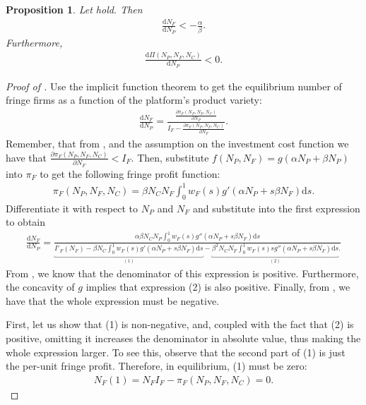 \documentclass[a4paper]{article}
\newtheorem{proposition}{Proposition}
\newcommand{\dd}{\mathrm{d}}
\newcommand{\ds}{\mathrm{d}s}
\begin{document}
\begin{proposition}
    \label{prop:aggregate_size_additive}
    Let  hold.
    Then
    \begin{align*}
        \frac{\dd N_F}{\dd N_P} < -\frac{\alpha}{\beta}.
    \end{align*}
    Furthermore,
    \begin{align*}
        \frac{\dd \Pi(N_P, N_F, N_C)}{\dd N_P} < 0.
    \end{align*}
\end{proposition}
\begin{proof}[Proof of ]
    Use the implicit function theorem to get the equilibrium number of fringe firms as a function of the platform's product variety:
    \begin{align*}
        \frac{\dd N_F}{\dd N_P} = \frac{\frac{\partial \pi_F(N_P, N_F, N_C)}{\partial N_P}}{I_F - \frac{\partial \pi_F (N_P, N_F, N_C)}{\partial N_F}}.
    \end{align*}
    Remember, that from , and the assumption on the investment cost function we have that $\frac{\partial \pi_F (N_P, N_F, N_C)}{\partial N_F} < I_F$.
    Then, substitute $f(N_P, N_F) = g(\alpha N_P + \beta N_P)$ into $\pi_F$ to get the following fringe profit function:
    \begin{align*}
        \pi_F(N_P, N_F, N_C) = \beta N_C N_F \int_0^1 w_F(s) g'(\alpha N_P + s \beta N_F) \ds.
    \end{align*}
    Differentiate it with respect to $N_P$ and $N_F$ and substitute into the first expression to obtain
    \begin{align*}
        \frac{\dd N_F}{\dd N_P} = \frac{
            \alpha \beta N_C N_P \int_0^1 w_F(s) g''(\alpha N_P + s \beta N_F) \ds
        }{
            \underbracket{I'_F(N_F) - \beta N_C \int_0^1 w_F(s) g'(\alpha N_P + s \beta N_F) \ds}_{(1)} - \underbracket{\beta^2 N_C N_F \int_0^1 w_F(s) s g''(\alpha N_P + s \beta N_F) \ds}_{(2)}.
        }
    \end{align*}
    From , we know that the denominator of this expression is positive.
    Furthermore, the concavity of $g$ implies that expression (2) is also positive.
    Finally, from , we have that the whole expression must be negative.

    First, let us show that (1) is non-negative, and, coupled with the fact that (2) is positive, omitting it increases the denominator in absolute value, thus making the whole expression larger.
    To see this, observe that the second part of (1) is just the per-unit fringe profit.
    Therefore, in equilibrium, (1) must be zero:
    \begin{align*}
        N_F (1) = N_F I_F - \pi_F(N_P, N_F, N_C) = 0.
    \end{align*}


\end{proof}
\end{document}
